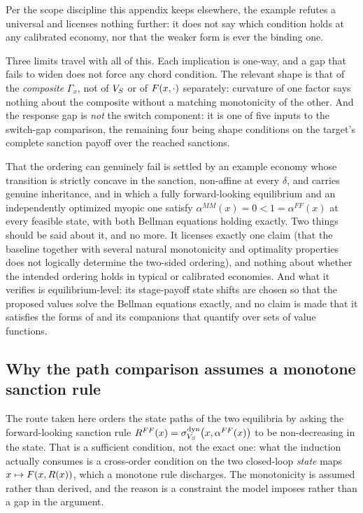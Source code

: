 Per the scope discipline this appendix keeps elsewhere, the example refutes a
universal and licenses nothing further: it does not say which condition holds at
any calibrated economy, nor that the weaker form is ever the binding one.

Three limits travel with all of this. Each implication is one-way, and a gap that
fails to widen does not force any chord condition. The relevant shape is that of
the \emph{composite} $\Gamma_x$, not of $V_S$ or of $F(x,\cdot)$ separately:
curvature of one factor says nothing about the composite without a matching
monotonicity of the other. And the response gap is \emph{not} the switch component:
it is one of five inputs to the switch-gap comparison, the remaining four being
shape conditions on the target's complete sanction payoff over the reached
sanctions.

That the ordering can genuinely fail is settled by an example economy whose
transition is strictly concave in the sanction, non-affine at every $\delta$, and
carries genuine inheritance, and in which a fully forward-looking equilibrium and
an independently optimized myopic one satisfy
$\alpha^{MM}(x)=0<1=\alpha^{FF}(x)$ at every feasible state, with both Bellman
equations holding exactly. Two things should be said about it, and no more.
It licenses exactly one claim (that the baseline together with several natural
monotonicity and optimality properties does not logically determine the two-sided
ordering), and nothing about whether the intended ordering holds in typical or
calibrated economies. And what it verifies is equilibrium-level: its
stage-payoff state shifts are chosen so that the proposed values solve the
Bellman equations exactly, and no claim is made that it satisfies the
forms of  and its companions that quantify over sets of value functions.

\subsection{Why the path comparison assumes a monotone sanction rule}
\label{app:closed-loop-monotone}

The route taken here orders the state paths of the two equilibria by asking the
forward-looking sanction rule $R^{FF}(x)=\sigma^{\mathrm{dyn}}_{V_S}\bigl(x,\alpha^{FF}(x)\bigr)$
to be non-decreasing in the state. That is a sufficient condition, not the exact
one: what the induction actually consumes is a cross-order condition on the two
closed-loop \emph{state} maps $x\mapsto F(x,R(x))$, which a monotone
rule discharges. The monotonicity is assumed rather than derived, and the reason
is a constraint the model imposes rather than a gap in the argument.

